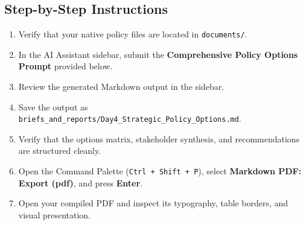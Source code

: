 \documentclass[11pt, a4paper]{report}
\begin{document}
\subsection{Step-by-Step Instructions}
\begin{enumerate}[label=\textbf{Step \arabic*:}]
    \item Verify that your native policy files are located in \texttt{documents/}.
    \item In the AI Assistant sidebar, submit the \textcolor{tanzaniablue}{\textbf{Comprehensive Policy Options Prompt}} provided below.
    \item Review the generated Markdown output in the sidebar.
    \item Save the output as \texttt{briefs\_and\_reports/Day4\_Strategic\_Policy\_Options.md}.
    \item Verify that the options matrix, stakeholder synthesis, and recommendations are structured cleanly.
    \item Open the Command Palette (\texttt{Ctrl + Shift + P}), select \textbf{Markdown PDF: Export (pdf)}, and press \textbf{Enter}.
    \item Open your compiled PDF and inspect its typography, table borders, and visual presentation.
\end{enumerate}
\end{document}

